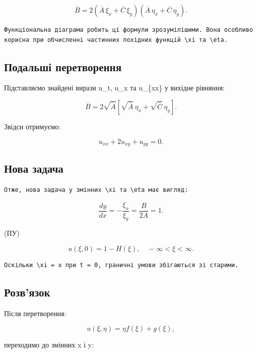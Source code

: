 \documentclass[
  ukrainian,
]{article}
\begin{document}
\[
\overline{B} = 2\left( \overline{A}\,\xi_x + \overline{C}\,\xi_y \right)
\left( \overline{A}\,\eta_x + \overline{C}\,\eta_y \right).
\]

\begin{verbatim}
Функціональна діаграма робить ці формули зрозумілішими. Вона особливо корисна при обчисленні частинних похідних функцій \xi та \eta.
\end{verbatim}

\subsection{Подальші
перетворення}\label{ux43fux43eux434ux430ux43bux44cux448ux456-ux43fux435ux440ux435ux442ux432ux43eux440ux435ux43dux43dux44f}

Підставляємо знайдені вирази u\_t, u\_x та u\_\{xx\} у вихідне рівняння:

\[
\overline{B} = 2\sqrt{\overline{A}} \left[ \sqrt{\overline{A}}\, \eta_x + \sqrt{\overline{C}}\, \eta_y \right].
\]

Звідси отримуємо:

\[
u_{xx} + 2u_{xy} + u_{yy} = 0.
\]

\subsection{Нова
задача}\label{ux43dux43eux432ux430-ux437ux430ux434ux430ux447ux430}

\begin{verbatim}
Отже, нова задача у змінних \xi та \eta має вигляд:
\end{verbatim}

\[
\frac{dy}{dx} = -\frac{\xi_x}{\xi_y} = \frac{B}{2A} = 1.
\]

(ПУ)

\[
u(\xi, 0) = 1 - H(\xi), \quad -\infty < \xi < \infty.
\]

\begin{verbatim}
Оскільки \xi = x при t = 0, граничні умови збігаються зі старими.
\end{verbatim}

\subsection{Розв'язок}\label{ux440ux43eux437ux432ux44fux437ux43eux43a}

Після перетворення:

\[
u(\xi, \eta) = \eta f(\xi) + g(\xi),
\]

переходимо до змінних x і y:
\end{document}
